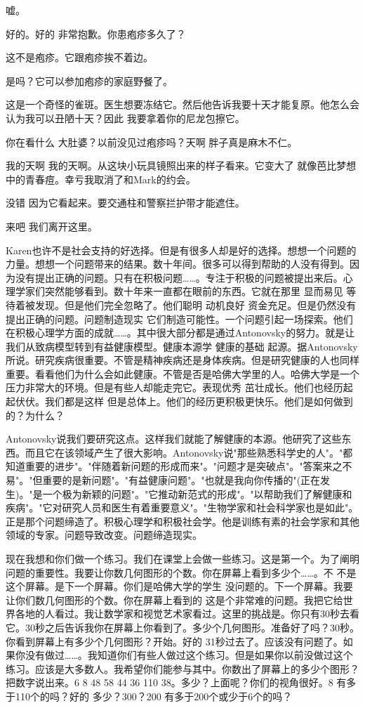 嘘。 

好的。好的 非常抱歉。你患疱疹多久了？ 

这不是疱疹。它跟疱疹挨不着边。 

是吗？它可以参加疱疹的家庭野餐了。 

这是一个奇怪的雀斑。医生想要冻结它。然后他告诉我要十天才能复原。他怎么会认为我可以丑陋十天？因此 我要拿着你的尼龙包擦它。 

你在看什么 大肚婆？以前没见过疱疹吗？天啊 胖子真是麻木不仁。 

我的天啊 我的天啊。从这块小玩具镜照出来的样子看来。它变大了 就像芭比梦想中的青春痘。幸亏我取消了和Mark的约会。 

没错 因为它看起来。要交通柱和警察拦护带才能遮住。 

来吧 我们离开这里。 

Karen也许不是社会支持的好选择。但是有很多人却是好的选择。想想一个问题的力量。想想一个问题带来的结果。数十年间。很多可以得到帮助的人没有得到。因为没有提出正确的问题。只有在积极问题……。专注于积极的问题被提出来后。心理学家们突然能够看到。数十年来一直都在眼前的东西。它就在那里 显而易见 等待着被发现。但是他们完全忽略了。他们聪明 动机良好 资金充足。但是仍然没有提出正确的问题。问题制造现实 它们制造可能性。一个问题引起一场探索。他们在积极心理学方面的成就……。其中很大部分都是通过Antonovsky的努力。就是让我们从致病模型转到有益健康模型。健康本源学 健康的基础 起源。据Antonovsky所说。研究疾病很重要。不管是精神疾病还是身体疾病。但是研究健康的人也同样重要。看看他们为什么会如此健康。不管是否是哈佛大学里的人。哈佛大学是一个压力非常大的环境。但是有些人却能走完它。表现优秀 茁壮成长。他们也经历起起伏伏。我们都是这样 但是总体上。他们的经历更积极更快乐。他们是如何做到的？为什么？ 

Antonovsky说我们要研究这点。这样我们就能了解健康的本源。他研究了这些东西。而且它在该领域产生了很大影响。Antonovsky说"那些熟悉科学史的人"。"都知道重要的进步"。"伴随着新问题的形成而来"。"问题才是突破点"。"答案来之不易"。"但重要的是新问题"。"有益健康问题"。"也就是我向你传播的"(正在发生)。"是一个极为新颖的问题"。"它推动新范式的形成"。"以帮助我们了解健康和疾病"。"它对研究人员和医生有着重要意义"。"生物学家和社会科学家也是如此"。正是那个问题缔造了。积极心理学和积极社会学。他是训练有素的社会学家和其他领域的专家。问题导致改变。问题缔造现实。 

现在我想和你们做一个练习。我们在课堂上会做一些练习。这是第一个。为了阐明问题的重要性。我要让你数几何图形的个数。你在屏幕上看到多少个……。不 不是这个屏幕。是下一个屏幕。你们是哈佛大学的学生 没问题的。下一个屏幕。我要让你们数几何图形的个数。你在屏幕上看到的 这是个非常难的问题。我把它给世界各地的人看过。我让数学家和视觉艺术家看过。这里的挑战是。你只有30秒去看它。30秒之后告诉我你在屏幕上你看到了。多少个几何图形。准备好了吗？30秒。你看到屏幕上有多少个几何图形？开始。好的 31秒过去了。应该没有问题了。如果你没有做过……。我知道你们有些人做过这个练习。但是如果你以前没做过这个练习。应该是大多数人。我希望你们能参与其中。你数出了屏幕上的多少个图形？把数字说出来。6 8 48 58 44 36 110 38。多少？上面呢？你们的视角很好。8 有多于110个的吗？好的 多少？300？200 有多于200个或少于6个的吗？ 

